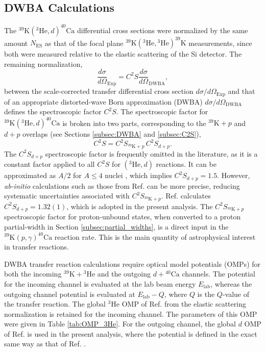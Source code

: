 \newpage

\subsection{DWBA Calculations} \label{subsec:DWBA_Cross}

The $^{39}\mathrm{K}(^{3}\mathrm{He},d)^{40}\mathrm{Ca}$ differential cross sections were normalized by the same amount $N_{\mathrm{ES}}$ as that of the focal plane $^{39}\mathrm{K}(^{3}\mathrm{He}, {}^{3}\mathrm{He})^{39}\mathrm{K}$ measurements, since both were measured relative to the elastic scattering of the Si detector. The remaining normalization,
\begin{equation} \label{eqn:spec_factor_dwba}
\frac{d\sigma}{d\Omega}_{\mathrm{Exp}} = C^{2}S \frac{d\sigma}{d\Omega}_{\mathrm{DWBA}},
\end{equation}
between the scale-corrected transfer differential cross section $d\sigma/d\Omega_{\mathrm{Exp}}$ and that of an appropriate distorted-wave Born approximation (DWBA) $d\sigma/d\Omega_{\mathrm{DWBA}}$ defines the spectroscopic factor $C^{2}S$. The spectroscopic factor for $^{39}\mathrm{K}(^{3}\mathrm{He},d)^{40}\mathrm{Ca}$ is broken into two parts, corresponding to the $^{39}\mathrm{K}+p$ and $d+p$ overlaps (see Sections \ref{subsec:DWBA} and \ref{subsec:C2S}),
\begin{equation}
C^{2}S = C^{2}S_{^{39}\mathrm{K}+p} \, C^{2}S_{d+p}.
\end{equation}
The $C^{2}S_{d+p}$ spectroscopic factor is frequently omitted in the literature, as it is a constant factor applied to all $C^{2}S$ for $(^{3}\mathrm{He},d)$ reactions. It can be approximated as $A/2$ for $A \leq 4$ nuclei \cite{Satchler1988}, which implies $C^{2}S_{d+p} = 1.5$. However, \emph{ab-initio} calculations such as those from Ref. \cite{Brida2011} can be more precise, reducing systematic uncertainties associated with $C^{2}S_{^{39}\mathrm{K}+p}$. Ref. \cite{Brida2011} calculates $C^{2}S_{d+p} = 1.32(1)$, which is adopted in the present analysis. The $C^{2}S_{^{39}\mathrm{K}+p}$ spectroscopic factor for proton-unbound states, when converted to a proton partial-width in Section \ref{subsec:partial_widths}, is a direct input in the $^{39}\mathrm{K}(p,\gamma)^{40}\mathrm{Ca}$ reaction rate. This is the main quantity of astrophysical interest in transfer reactions.

DWBA transfer reaction calculations require optical model potentials (OMPs) for both the incoming $^{39}\mathrm{K} + {}^{3}\mathrm{He}$ and the outgoing $d + {}^{40}\mathrm{Ca}$ channels. The potential for the incoming channel is evaluated at the lab beam energy $E_{\mathrm{lab}}$, whereas the outgoing channel potential is evaluated at $E_{\mathrm{lab}} - Q$, where $Q$ is the $Q$-value of the transfer reaction. The global $^{3}$He OMP of Ref. \cite{Liang2009} from the elastic scattering normalization is retained for the incoming channel. The parameters of this OMP were given in Table \ref{tab:OMP_3He}. For the outgoing channel, the global $d$ OMP of Ref. \cite{An2006} is used in the present analysis, where the potential is defined in the exact same way as that of Ref. \cite{Liang2009}.

